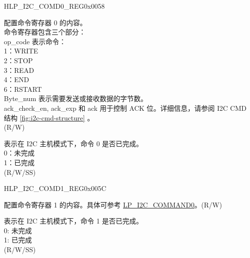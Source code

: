\begin{register}{H}{LP\_I2C\_COMD0\_REG}{0x0058}\label{regdesc:LPI2CCOMD0REG}
%
%
%
\regnewline%
\begin{regdesc}\begin{reglist}
\label{fielddesc:LPI2CCOMMAND0}\item [LP\_I2C\_COMMAND0] 配置命令寄存器 0 的内容。 \\
命令寄存器包含三个部分：\\
op\_code 表示命令：\\
1：WRITE\\
2：STOP\\
3：READ\\
4：END\\
6：RSTART\\
Byte\_num 表示需要发送或接收数据的字节数。\\
ack\_check\_en, ack\_exp 和 ack 用于控制 ACK 位。详细信息，请参阅 I2C CMD 结构 \ref{fig:i2c-cmd-structure} 。\\(R/W)
\label{fielddesc:LPI2CCOMMAND0DONE}\item [LP\_I2C\_COMMAND0\_DONE] 表示在 I2C 主机模式下，命令 0 是否已完成。\\
0：未完成\\
1：已完成 \\ (R/W/SS)
\end{reglist}\end{regdesc}
\end{register}


\begin{register}{H}{LP\_I2C\_COMD1\_REG}{0x005C}\label{regdesc:LPI2CCOMD1REG}
%
%
%
\regnewline%
\begin{regdesc}\begin{reglist}
\label{fielddesc:LPI2CCOMMAND1}\item [LP\_I2C\_COMMAND1] 配置命令寄存器 1 的内容。具体可参考 \hyperref[fielddesc:LPI2CCOMMAND0]{LP\_I2C\_COMMAND0}。(R/W)
\label{fielddesc:LPI2CCOMMAND1DONE}\item [LP\_I2C\_COMMAND1\_DONE] 表示在 I2C 主机模式下，命令 1 是否已完成。\\
0: 未完成\\
1: 已完成 \\ (R/W/SS)
\end{reglist}\end{regdesc}
\end{register}


